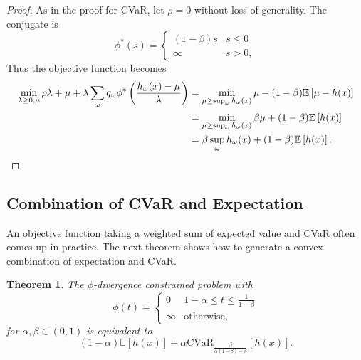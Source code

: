 \documentclass[11pt]{article}
\newcommand{\E}{\mathbb{E}}
\newcommand{\e}[1]{\E \left[ #1 \right]}
\newtheorem{theorem}{Theorem}
\begin{document}
\begin{proof}
	As in the proof for CVaR, let $\rho = 0$ without loss of generality.
	The conjugate is
	\[
		\phi^*(s) = 
		\begin{cases}
			(1-\beta)s & s \leq 0 \\
			\infty & s > 0,
		\end{cases}
	\]
	Thus the objective function becomes
	\begin{align*}
		\min_{\lambda \geq 0,\mu} \rho\lambda + \mu + \lambda \sum_\omega q_\omega \phi^*\left(\frac{h_\omega(x) - \mu}{\lambda}\right) & = \min_{\mu \geq \sup_\omega h_\omega(x)} \mu - (1-\beta)\e{\mu-h(x)} \\
		& = \min_{\mu \geq \sup_\omega h_\omega(x)} \beta \mu + (1-\beta)\e{h(x)} \\
		& = \beta \sup_\omega h_\omega(x) + (1-\beta)\e{h(x)}. \qedhere
	\end{align*}
\end{proof}

\subsection{Combination of CVaR and Expectation}

An objective function taking a weighted sum of expected value and CVaR often comes up in practice.
The next theorem shows how to generate a convex combination of expectation and CVaR.

\begin{theorem}\label{them:expectation_cvar}
	The $\phi$-divergence constrained problem with
	\[
		\phi(t) = 
		\begin{cases}
			0 & 1-\alpha \leq t \leq \frac{1}{1-\beta} \\
			\infty & \text{otherwise},
		\end{cases}
	\]
	for $\alpha,\beta \in (0,1)$ is equivalent to 
	\[
		(1-\alpha)\e{h(x)} + \alpha \mbox{CVaR}_{\frac{\beta}{\alpha(1-\beta)+\beta}}[h(x)].
	\]
\end{theorem}
\end{document}
